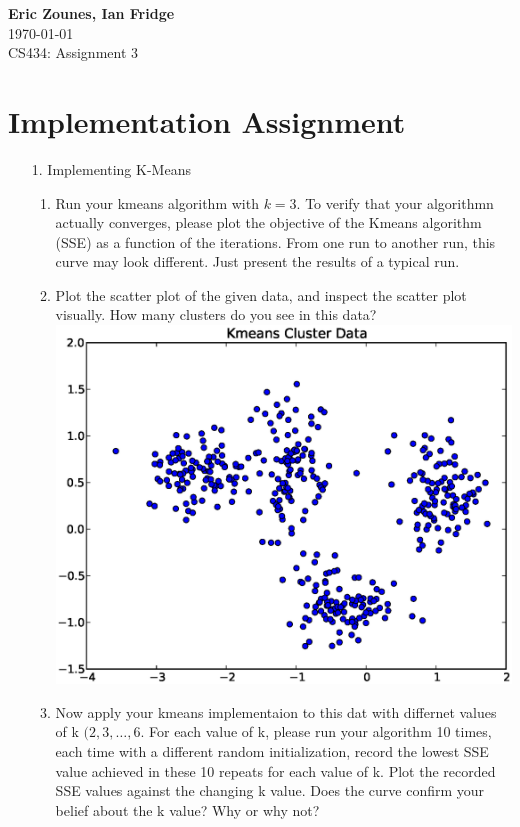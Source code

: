 \documentclass[12pt,letterpaper]{article}
\begin{document}
\setcounter{subsection}{2} 
\begin{flushright}
\end{flushright}
\begin{flushleft}
\textbf{Eric Zounes, Ian Fridge} \\
\today \\ 
CS434: Assignment 3
\end{flushleft}
\section[1]{Implementation Assignment} 
\begin{enumerate} 
	\item[1.] Implementing K-Means 	
	\begin{enumerate} 
		\item Run your kmeans algorithm with $k = 3$. To verify that your algorithmn actually converges, please plot the objective of the Kmeans algorithm (SSE) as a function of the iterations. From one run to another run, this curve may look different. Just present the results of a typical run. \\
		\item Plot the scatter plot of the given data, and inspect the scatter plot visually. How many clusters do you see in this data? \\
		\includegraphics[width=6in]{kmeans_scatter.eps}
		\item Now apply your kmeans implementaion to this dat with differnet values of k $(2,3, \ldots, 6$. For each value of k, please run your algorithm 10 times, each time with a different random initialization, record the lowest SSE value achieved in these 10 repeats for each value of k. Plot the recorded SSE values against the changing k value. Does the curve confirm your belief about the k value? Why or why not? \\
	\end{enumerate} 
\end{enumerate} 
\end{document}
